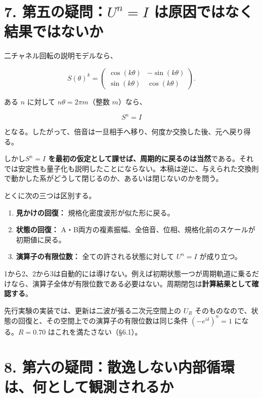 \documentclass[
  a4paper,
]{ltjsarticle}
\providecommand{\tightlist}{%
  \setlength{\itemsep}{0pt}\setlength{\parskip}{0pt}}
\begin{document}
\section{\texorpdfstring{7. 第五の疑問：\(U^n=I\)
は原因ではなく結果ではないか}{7. 第五の疑問：U\^{}n=I は原因ではなく結果ではないか}}\label{ux7b2cux4e94ux306eux7591ux554funi-ux306fux539fux56e0ux3067ux306fux306aux304fux7d50ux679cux3067ux306fux306aux3044ux304b}

二チャネル回転の説明モデルなら、

\[
S(\theta)^k=
\begin{pmatrix}
\cos(k\theta)&-\sin(k\theta)\\
\sin(k\theta)&\cos(k\theta)
\end{pmatrix}.
\]

ある \(n\) に対して \(n\theta=2\pi m\)（整数 \(m\)）なら、

\[
S^n=I
\]

となる。したがって、倍音は一旦相手へ移り、何度か交換した後、元へ戻り得る。

しかし\textbf{\(S^n=I\)
を最初の仮定として課せば、周期的に戻るのは当然}である。それでは安定性も量子化も説明したことにならない。本稿は逆に、与えられた交換則で動かした系がどうして閉じるのか、あるいは閉じないのかを問う。

とくに次の三つは区別する。

\begin{enumerate}
\def\labelenumi{\arabic{enumi}.}
\tightlist
\item
  \textbf{見かけの回復：} 規格化密度波形が似た形に戻る。
\item
  \textbf{状態の回復：}
  A・B両方の複素振幅、全倍音、位相、規格化前のスケールが初期値に戻る。
\item
  \textbf{演算子の有限位数：} 全ての許される状態に対して \(U^n=I\)
  が成り立つ。
\end{enumerate}

1から2、2から3は自動的には導けない。例えば初期状態一つが周期軌道に乗るだけなら、演算子全体が有限位数である必要はない。周期閉包は\textbf{計算結果として確認する}。

先行実験の実装では、更新は二波が張る二次元空間上の \(U_R\)
そのものなので、状態の回復と、その空間上での演算子の有限位数は同じ条件
\((-e^{i\delta})^n=1\) になる。\(R=0.70\) はこれを満たさない（§6.1）。

\section{8.
第六の疑問：散逸しない内部循環は、何として観測されるか}\label{ux7b2cux516dux306eux7591ux554fux6563ux9038ux3057ux306aux3044ux5185ux90e8ux5faaux74b0ux306fux4f55ux3068ux3057ux3066ux89b3ux6e2cux3055ux308cux308bux304b}
\end{document}
